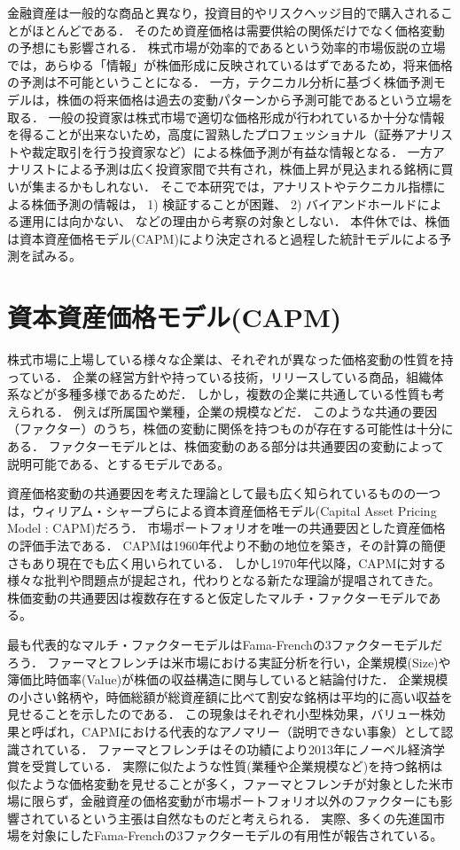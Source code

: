 ﻿\documentclass[11pt]{jreport}
\begin{document}
金融資産は一般的な商品と異なり，投資目的やリスクヘッジ目的で購入されることがほとんどである．
そのため資産価格は需要供給の関係だけでなく価格変動の予想にも影響される．
株式市場が効率的であるという効率的市場仮説の立場では，あらゆる「情報」が株価形成に反映されているはずであるため，将来価格の予測は不可能ということになる．
一方，テクニカル分析に基づく株価予測モデルは，株価の将来価格は過去の変動パターンから予測可能であるという立場を取る．
一般の投資家は株式市場で適切な価格形成が行われているか十分な情報を得ることが出来ないため，高度に習熟したプロフェッショナル（証券アナリストや裁定取引を行う投資家など）による株価予測が有益な情報となる．
一方アナリストによる予測は広く投資家間で共有され，株価上昇が見込まれる銘柄に買いが集まるかもしれない．
そこで本研究では，アナリストやテクニカル指標による株価予測の情報は，
1) 検証することが困難、
2) バイアンドホールドによる運用には向かない、
などの理由から考察の対象としない．
本件休では、株価は資本資産価格モデル(CAPM)により決定されると過程した統計モデルによる予測を試みる。

\section{資本資産価格モデル(CAPM)}
株式市場に上場している様々な企業は、それぞれが異なった価格変動の性質を持っている．
企業の経営方針や持っている技術，リリースしている商品，組織体系などが多種多様であるためだ．
しかし，複数の企業に共通している性質も考えられる．
例えば所属国や業種，企業の規模などだ．
このような共通の要因（ファクター）のうち，株価の変動に関係を持つものが存在する可能性は十分にある．
ファクターモデルとは、株価変動のある部分は共通要因の変動によって説明可能である、とするモデルである。

資産価格変動の共通要因を考えた理論として最も広く知られているものの一つは，ウィリアム・シャープらによる資本資産価格モデル(Capital Asset Pricing Model : CAPM)だろう．
市場ポートフォリオを唯一の共通要因とした資産価格の評価手法である．
CAPMは1960年代より不動の地位を築き，その計算の簡便さもあり現在でも広く用いられている．
しかし1970年代以降，CAPMに対する様々な批判や問題点が提起され，代わりとなる新たな理論が提唱されてきた。
株価変動の共通要因は複数存在すると仮定したマルチ・ファクターモデルである。


最も代表的なマルチ・ファクターモデルはFama-Frenchの3ファクターモデル\cite{Fama}だろう．
ファーマとフレンチは米市場における実証分析を行い，企業規模(Size)や簿価比時価率(Value)が株価の収益構造に関与していると結論付けた．
企業規模の小さい銘柄や，時価総額が総資産額に比べて割安な銘柄は平均的に高い収益を見せることを示したのである．
この現象はそれぞれ小型株効果，バリュー株効果と呼ばれ，CAPMにおける代表的なアノマリー（説明できない事象）として認識されている．
ファーマとフレンチはその功績により2013年にノーベル経済学賞を受賞している．
実際に似たような性質(業種や企業規模など)を持つ銘柄は似たような価格変動を見せることが多く，ファーマとフレンチが対象とした米市場に限らず，金融資産の価格変動が市場ポートフォリオ以外のファクターにも影響されているという主張は自然なものだと考えられる．
実際、多くの先進国市場を対象にしたFama-Frenchの3ファクターモデルの有用性が報告されている。
\end{document}
